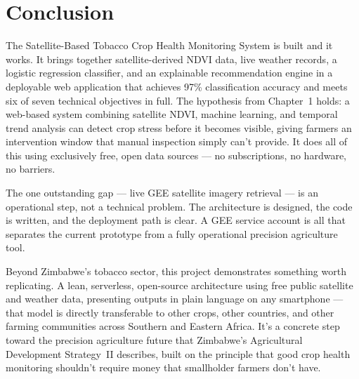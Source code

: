 \documentclass[12pt,a4paper]{report}
\begin{document}
\section{Conclusion}

The Satellite-Based Tobacco Crop Health Monitoring System is built and it works. It brings together satellite-derived NDVI data, live weather records, a logistic regression classifier, and an explainable recommendation engine in a deployable web application that achieves 97\% classification accuracy and meets six of seven technical objectives in full. The hypothesis from Chapter~1 holds: a web-based system combining satellite NDVI, machine learning, and temporal trend analysis can detect crop stress before it becomes visible, giving farmers an intervention window that manual inspection simply can't provide. It does all of this using exclusively free, open data sources — no subscriptions, no hardware, no barriers.

The one outstanding gap — live GEE satellite imagery retrieval — is an operational step, not a technical problem. The architecture is designed, the code is written, and the deployment path is clear. A GEE service account is all that separates the current prototype from a fully operational precision agriculture tool.

Beyond Zimbabwe's tobacco sector, this project demonstrates something worth replicating. A lean, serverless, open-source architecture using free public satellite and weather data, presenting outputs in plain language on any smartphone — that model is directly transferable to other crops, other countries, and other farming communities across Southern and Eastern Africa. It's a concrete step toward the precision agriculture future that Zimbabwe's Agricultural Development Strategy~II \citep{moa2022} describes, built on the principle that good crop health monitoring shouldn't require money that smallholder farmers don't have.

\clearpage
{}
\end{document}
